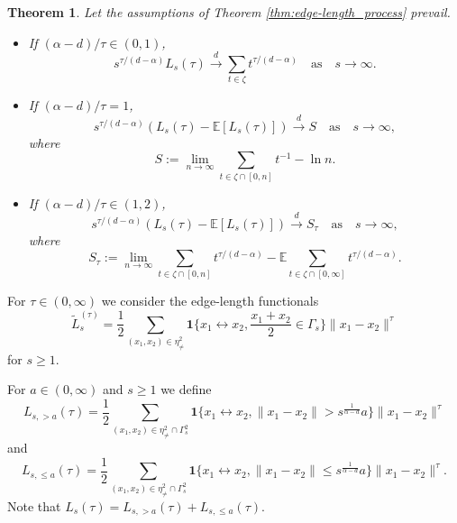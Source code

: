 \documentclass{article}
\newtheorem{theorem}{Theorem}[section]
\theoremstyle{definition}
\numberwithin{equation}{section}
\theoremstyle{remark}
\begin{document}
\begin{theorem}
Let the assumptions of Theorem \ref{thm:edge-length_process} prevail.
\begin{itemize}
\item [a)] If $(\alpha-d)/\tau\in(0,1)$,
$$
s^{\tau/(d-\alpha)}L_s(\tau) \overset{d}{\longrightarrow} \sum_{t\in\zeta} t^{\tau/(d-\alpha)} \quad \text{as} \quad s\to\infty.
$$
\item [b)] If $(\alpha-d)/\tau=1$,
$$
s^{\tau/(d-\alpha)}(L_s(\tau) - \mathbb{E}[L_s(\tau)])  \overset{d}{\longrightarrow} S \quad \text{as} \quad s\to\infty,
$$
where
$$
S:=\lim_{n\to\infty} \sum_{t\in\zeta\cap[0,n]} t^{-1} - \ln n.
$$
\item [c)] If $(\alpha-d)/\tau\in(1,2)$,
$$
s^{\tau/(d-\alpha)}(L_s(\tau) - \mathbb{E}[L_s(\tau)]) \overset{d}{\longrightarrow} S_\tau \quad \text{as} \quad s\to\infty,
$$
where
$$
S_\tau := \lim_{n\to\infty} \sum_{t\in\zeta\cap[0,n]} t^{\tau/(d-\alpha)} - \mathbb{E}\sum_{t\in\zeta\cap[0,\infty]} t^{\tau/(d-\alpha)}.
$$
\end{itemize}
\end{theorem}



For $\tau\in(0,\infty)$ we consider the edge-length functionals
$$
\widetilde{L}_s^{(\tau)} = \frac{1}{2} \sum_{(x_1,x_2)\in\eta^2_{\neq}} \mathbf{1}\bigg\{ x_1\leftrightarrow x_2, \frac{x_1+x_2}{2}\in\Gamma_s \bigg\} \|x_1-x_2\|^\tau
$$
for $s\geq 1$.

\fi

For $a\in(0,\infty)$ and $s\geq 1$ we define
$$
L_{s,>a}(\tau) = \frac{1}{2} \sum_{(x_1,x_2)\in\eta^2_{\neq}\cap\Gamma_s^2} \mathbf{1}\big\{x_1\leftrightarrow x_2,\|x_1-x_2\|>s^{\frac{1}{\alpha-d}}a\big\} \|x_1-x_2\|^\tau
$$
and
$$
L_{s,\leq a}(\tau) = \frac{1}{2} \sum_{(x_1,x_2)\in\eta^2_{\neq}\cap\Gamma_s^2} \mathbf{1}\{x_1\leftrightarrow x_2, \|x_1-x_2\|\leq s^{\frac{1}{\alpha-d}}a\} \|x_1-x_2\|^\tau.
$$
Note that $L_s(\tau)=L_{s,>a}(\tau)+L_{s,\leq a}(\tau)$.

\end{document}

